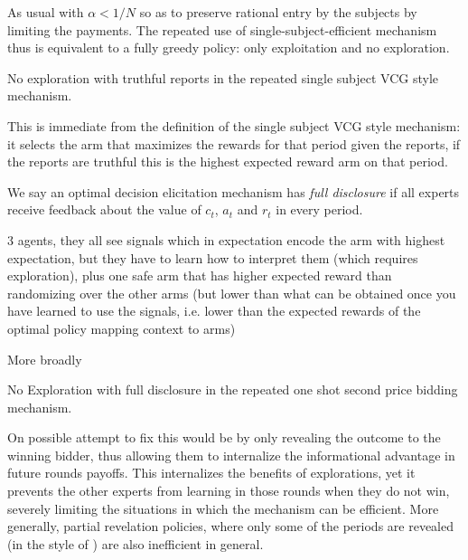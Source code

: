 As usual with $\alpha < 1/N$ so as to preserve rational entry by the subjects by limiting the payments.
The repeated use of single-subject-efficient mechanism thus is equivalent to a fully greedy policy: only exploitation and no exploration.

\begin{lem}
No exploration with truthful reports in the repeated single subject VCG style mechanism.
\end{lem}

This is immediate from the definition of the single subject VCG style mechanism: it selects the arm that maximizes the rewards for that period given the reports, if the reports are truthful this is the highest expected reward arm on that period. 

\begin{defn}
We say an optimal decision elicitation mechanism has \emph{full disclosure} if all experts receive feedback about the value of $c_t$, $a_t$ and $r_t$ in every period.
\end{defn}


\begin{eg}
3 agents, they all see signals which in expectation encode the arm with highest expectation, but they have to learn how to interpret them (which requires exploration), plus one safe arm that has higher expected reward than randomizing over the other arms (but lower than what can be obtained once you have learned to use the signals, i.e. lower than the expected rewards of the optimal policy mapping context to arms)
\end{eg}

More broadly

\begin{lem}
No Exploration with full disclosure in the repeated one shot second price bidding mechanism.
\end{lem}



On possible attempt to fix this would be by only revealing the outcome to the winning bidder, thus allowing them to internalize the informational advantage in future rounds payoffs. 
This  internalizes the benefits of explorations, yet it prevents the other experts from learning in those rounds when they do not win, severely limiting the situations in which the mechanism can be efficient. 
More generally, partial revelation policies, where only some of the periods are revealed (in the style of  \cite{mansour2015bayesian} ) are also inefficient in general. 
 
